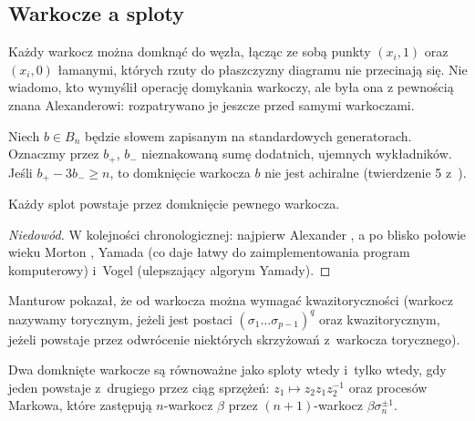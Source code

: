 
\subsection{Warkocze a sploty}
Każdy warkocz można domknąć do węzła, łącząc ze sobą punkty $(x_i, 1)$ oraz $(x_i, 0)$
łamanymi, których rzuty do płaszczyzny diagramu nie przecinają się.
%
Nie wiadomo, kto wymyślił operację domykania warkoczy, ale była ona z pewnością znana Alexanderowi: rozpatrywano je jeszcze przed samymi warkoczami.
%

Niech $b \in B_n$ będzie słowem zapisanym na standardowych generatorach.
Oznaczmy przez $b_+$, $b_-$ nieznakowaną sumę dodatnich, ujemnych wykładników.
Jeśli $b_+ - 3b_- \ge n$, to domknięcie warkocza $b$ nie jest achiralne (twierdzenie 5 z~\cite{jones85}).
%

\begin{theorem}[Alexander, 1923]
\label{thm:alexander}
     Każdy splot powstaje przez domknięcie pewnego warkocza.
\end{theorem}

\begin{proof}[Niedowód]
    W kolejności chronologicznej:
    najpierw Alexander \cite{alexander23},
%
    a po blisko połowie wieku Morton \cite{mortonhr86},
%
    Yamada \cite{yamada87} (co daje łatwy do zaimplementowania program komputerowy)
%
    i~Vogel \cite{vogel90} (ulepszający algorym Yamady).
%
\end{proof}

Manturow \cite{manturov02} pokazał, że od warkocza można wymagać kwazitoryczności (warkocz nazywamy torycznym, jeżeli jest postaci $(\sigma_1 \ldots \sigma_{p-1})^q$ oraz kwazitorycznym, jeżeli powstaje przez odwrócenie niektórych skrzyżowań z~warkocza torycznego).
%
%

\begin{theorem}[Markow, 1936]
%
\label{markov_theorem}
    Dwa domknięte warkocze są równoważne jako sploty wtedy i~tylko wtedy,
    gdy jeden powstaje z~drugiego przez ciąg
    sprzężeń: $z_1 \mapsto z_2 z_1 z_2^{-1}$ oraz procesów Markowa,
    które zastępują $n$-warkocz $\beta$ przez $(n+1)$-warkocz $\beta\sigma_n^{\pm 1}$.
\end{theorem}

